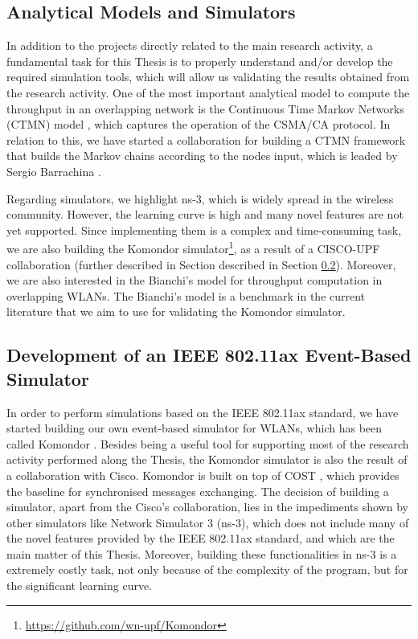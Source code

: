 \documentclass[12pt, a4paper,twoside]{tesi_upf}
\begin{document}
			\subsection{Analytical Models and Simulators}
			\label{section:validation}	
				In addition to the projects directly related to the main research activity, a fundamental task for this Thesis is to properly understand and/or develop the required simulation tools, which will allow us validating the results obtained from the research activity. One of the most important analytical model to compute the throughput in an overlapping network is the Continuous Time Markov Networks (CTMN) model \cite{bellalta2014throughput}, which captures the operation of the CSMA/CA protocol. In relation to this, we have started a collaboration for building a CTMN framework that builds the Markov chains according to the nodes input, which is leaded by Sergio Barrachina \cite{barrachina2017ctmn}. 
				
				Regarding simulators, we highlight ns-3, which is widely spread in the wireless community. However, the learning curve is high and many novel features are not yet supported. Since implementing them is a complex and time-consuming task, we are also building the Komondor simulator\footnote{\url{https://github.com/wn-upf/Komondor}}, as a result of a CISCO-UPF collaboration (further described in Section described in Section \ref{section:cisco_project}). Moreover, we are also interested in the Bianchi's model \cite{bianchi2000performance} for throughput computation in overlapping WLANs. The Bianchi's model is a benchmark in the current literature that we aim to use for validating the Komondor simulator.	

			\subsection{Development of an IEEE 802.11ax Event-Based Simulator}
			\label{section:cisco_project}	
				In order to perform simulations based on the IEEE 802.11ax standard, we have started building our own event-based simulator for WLANs, which has been called Komondor \cite{barrachina2017komondor}. Besides being a useful tool for supporting most of the research activity performed along the Thesis, the Komondor simulator is also the result of a collaboration with Cisco. Komondor is built on top of COST \cite{chen2005sense}, which provides the baseline for synchronised messages exchanging. The decision of building a simulator, apart from the Cisco's collaboration, lies in the impediments shown by other simulators like Network Simulator 3 (ns-3), which does not include many of the novel features provided by the IEEE 802.11ax standard, and which are the main matter of this Thesis. Moreover, building these functionalities in ns-3 is a extremely costly task, not only because of the complexity of the program, but for the significant learning curve.
				
\end{document}

